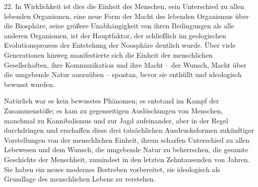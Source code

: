 \documentclass[11pt,a4paper]{book}
\begin{document}
22. In Wirklichkeit ist dies die Einheit des Menschen, sein Unterschied zu allen lebenden Organismen, eine neue Form der Macht des lebenden Organismus über die Biosphäre, seine größere Unabhängigkeit von ihren Bedingungen als alle anderen Organismen, ist der Hauptfaktor, der schließlich im geologischen Evolutionsprozess der Entstehung der Noosphäre deutlich wurde. Über viele Generationen hinweg manifestierte sich die Einheit der menschlichen Gesellschaften, ihre Kommunikation und ihre Macht -- der Wunsch, Macht über die umgebende Natur auszuüben -- spontan, bevor sie enthüllt und ideologisch bewusst wurden. 

Natürlich war es kein bewusstes Phänomen; es entstand im Kampf der Zusammenstöße; es kam zu gegenseitigen Auslöschungen von Menschen, manchmal zu Kannibalismus und zur Jagd aufeinander, aber in der Regel durchdringen und erschaffen diese drei tatsächlichen Ausdrucksformen zukünftiger Vorstellungen von der menschlichen Einheit, ihrem scharfen Unterschied zu allen Lebewesen und dem Wunsch, die umgebende Natur zu beherrschen, die gesamte Geschichte der Menschheit, zumindest in den letzten Zehntausenden von Jahren. Sie haben ein neues modernes Bestreben vorbereitet, sie ideologisch als Grundlage des menschlichen Lebens zu verstehen. 
\end{document}
